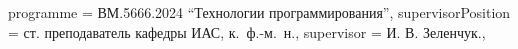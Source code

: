 {    %
    programme          = {ВМ.5666.2024 \enquote{Технологии программирования}},
    supervisorPosition = {ст. преподаватель кафедры ИАС, к.~ф.-м.~н.},
    supervisor         = {И. В. Зеленчук.},
}

